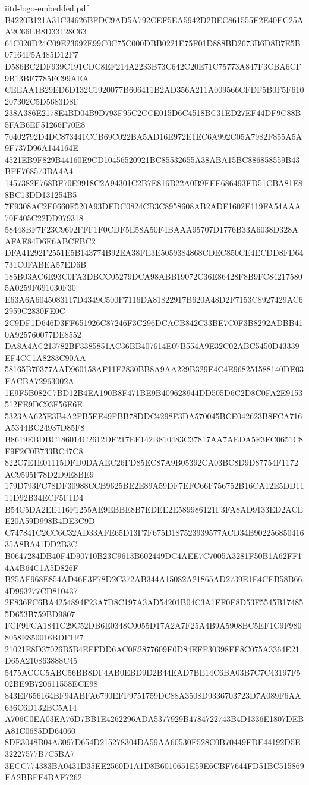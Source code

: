 \begin{filecontents*}[overwrite]{iitd-logo-embedded.pdf}
B4220B121A31C34626BFDC9AD5A792CEF5EA5942D2BEC861555E2E40EC25AA2C66EB8D33128C63
61C020D24C09E23692E99C0C75C000DBB0221E75F01D888BD2673B6D8B7E5B07164F5A485D12F7
D586BC2DF939C191CDC8EF214A2233B73C642C20E71C75773A847F3CBA6CF9B13BF7785FC99AEA
CEEAA1B29ED6D132C1920077B606411B2AD356A211A009566CFDF5B0F5F610207302C5D5683D8F
238A386E2178E4BD04B9D793F95C2CCE015D6C4518BC31ED27EF44DF9C88B5FAB6EF51266F70E8
70402792D4DC873441CCB69C022BA5AD16E972E1EC6A992C05A7982F855A5A9F737D96A144164E
4521EB9F829B44160E9CD10456520921BC85532655A38ABA15BC886858559B43BFF768573BA4A4
1457382E768BF70E9918C2A94301C2B7E816B22A0B9FEE686493ED51CBA81E88BC13DD131254B5
7F9308AC2E0660F520A93DFDC0824CB3C8958608AB2ADF1602E119FA54AAA70E405C22DD979318
58448BF7F23C9692FFF1F0CDF5E58A50F4BAAA95707D1776B33A6038D328AAFAE84D6F6ABCFBC2
DFA41292F2551E5B143774B92EA38FE3E5059384868CDEC850CE4ECDD8FD64731C0FABEA57ED6B
185B03AC6E93C0FA3DBCC05279DCA98ABB19072C36E86428F8B9FC842175805A0259F691030F30
E63A6A6045083117D4349C500F7116DA81822917B620A48D2F7153C8927429AC62959C2830FE0C
2C9DF1D646D3FF651926C87246F3C296DCACB842C33BE7C0F3B8292ADBB410A925760077DE8552
DA8A4AC213782BF3385851AC36BB407614E07B554A9E32C02ABC5450D43339EF4CC1A8283C90AA
58165B70377AAD960158AF11F2830BB8A9AA229B329E4C4E968251588140DE03EACBA72963002A
1E9F5B082C7BD12B4EA190B8F471BE9B409628944DD505D6C2D8C0FA2E9153512FE9DC93F56E6E
5323AA625E3B4A2FB5EE49FBB78DDC4298F3DA570045BCE042623B8FCA716A5344BC24937D85F8
B8619EBDBC186014C2612DE217EF142B810483C37817AA7AEDA5F3FC0651C8F9F2C0B733BC47C8
822C7E1E01115DFD0DAAEC26FD85EC87A9B05392CA03BC8D9D87754F1172AC9595F78D2D9E8BE9
179D793FC78DF30988CCB9625BE2E89A59DF7EFC66F756752B16CA12E5DD1111D92B34ECF5F1D4
B54C5DA2EE116F1255AE9EBBE8B7EDEE2E589986121F3FA8AD9133ED2ACEE20A59D998B4DE3C9D
C747841C2CC6C32AD33AFE65D13F7F675D187523939577ACD34B90225685041635A8BA41DD2B3C
B0647284DB40F4D90710B23C9613B602449DC4AEE7C7005A3281F50B1A62FF14A4B64C1A5D826F
B25AF968E854AD46F3F78D2C372AB344A15082A21865AD2739E1E4CEB58B664D993277CD810437
2F836FC6BA4254894F23A7D8C197A3AD54201B04C3A1FF0F8D53F5545B174855D653B759BD9807
FCF9FCA1841C29C52DB6E0348C0055D17A2A7F25A4B9A5908BC5EF1C9F9808058E850016BDF1F7
21021E8D37026B5B4EFFDD6AC0E2877609E0D84EFF30398FE8C075A3364E21D65A210863888C45
5475ACCC5ABC56BB8DF4AB0EBD9D2B44EAD7BE14C6BA03B7C7C43197F502BE9B720611558ECE98
843EF656164BF94ABFA6790EFF9751759DC88A3508D9336703723D7A089F6AA636C6D132BC5A14
A706C0EA03EA76D7BB1E4262296ADA5377929B4784722743B4D1336E1807DEBA81C0685DD64060
8DE3048B04A3097D654D215278304DA59AA60530F528C0B70449FDE44192D5E32227577B7C5BA7
3ECC774383BA0431D35EE2560D1A1D8B6010651E59E6CBF7644FD51BC515869EA2BBFF4BAF7262

\end{filecontents*}
